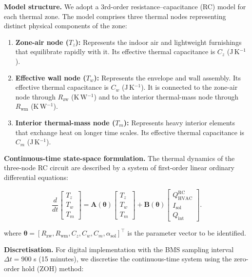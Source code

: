 \documentclass[11pt]{article}
\begin{document}
\textbf{Model structure.} We adopt a 3rd-order resistance--capacitance (RC) model for each thermal zone. The model comprises three thermal nodes representing distinct physical components of the zone:
\begin{enumerate}
    \item \textbf{Zone-air node ($T_z$):} Represents the indoor air and lightweight furnishings that equilibrate rapidly with it. Its effective thermal capacitance is $C_z$ (J\,K$^{-1}$).
    \item \textbf{Effective wall node ($T_w$):} Represents the envelope and wall assembly. Its effective thermal capacitance is $C_w$ (J\,K$^{-1}$). It is connected to the zone-air node through $R_{\mathrm{zw}}$ (K\,W$^{-1}$) and to the interior thermal-mass node through $R_{\mathrm{wm}}$ (K\,W$^{-1}$).
    \item \textbf{Interior thermal-mass node ($T_m$):} Represents heavy interior elements that exchange heat on longer time scales. Its effective thermal capacitance is $C_m$ (J\,K$^{-1}$).
\end{enumerate}

\textbf{Continuous-time state-space formulation.} The thermal dynamics of the three-node RC circuit are described by a system of first-order linear ordinary differential equations:

\begin{equation}
\frac{d}{dt}
\begin{bmatrix} T_z \\ T_w \\ T_m \end{bmatrix}
=
\mathbf{A}(\boldsymbol{\theta})
\begin{bmatrix} T_z \\ T_w \\ T_m \end{bmatrix}
+
\mathbf{B}(\boldsymbol{\theta})
\begin{bmatrix} Q_{\mathrm{HVAC}}^{\mathrm{RC}} \\ I_{\mathrm{sol}} \\ Q_{\mathrm{int}} \end{bmatrix}.
\end{equation}

where $\boldsymbol{\theta}=[R_{\mathrm{zw}},R_{\mathrm{wm}},C_z,C_w,C_m,\alpha_{\mathrm{sol}}]^\top$ is the parameter vector to be identified.

\textbf{Discretisation.} For digital implementation with the BMS sampling interval $\Delta t = 900$ s (15 minutes), we discretise the continuous-time system using the zero-order hold (ZOH) method:
\end{document}
